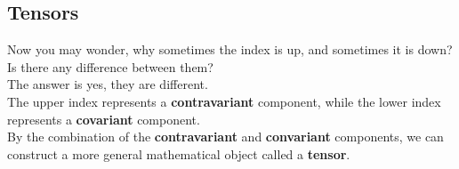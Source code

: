 \newpage
\subsection{Tensors}
\begin{intuition}
  Now you may wonder, why sometimes the index is up, and sometimes it is down? Is there any difference between them? \\
  \bigskip
  The answer is yes, they are different. \\
  The upper index represents a \textbf{contravariant} component, while the lower index represents a \textbf{covariant} component. \\
  By the combination of the \textbf{contravariant} and \textbf{convariant} components, we can construct a more general mathematical object called a \textbf{tensor}.
\end{intuition}

